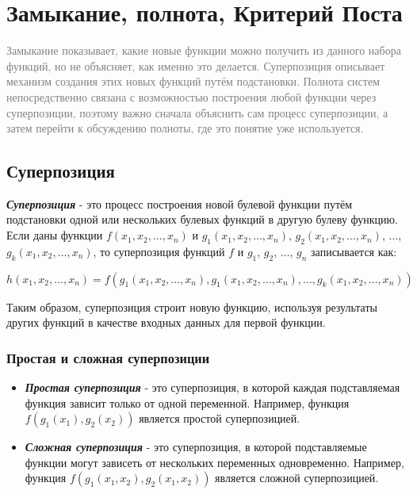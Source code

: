 \documentclass[12pt,letterpaper]{article}
\begin{document}
\section{Замыкание, полнота, Критерий Поста}

\textcolor{gray}{Замыкание показывает, какие новые функции можно получить из данного набора функций, но не объясняет, как именно это делается. Суперпозиция описывает механизм создания этих новых функций путём подстановки. Полнота систем непосредственно связана с возможностью построения любой функции через суперпозиции, поэтому важно сначала объяснить сам процесс суперпозиции, а затем перейти к обсуждению полноты, где это понятие уже используется.}

\subsection{Суперпозиция}

\textbf{\emph{Суперпозиция}} - это процесс построения новой булевой функции путём подстановки одной или нескольких булевых функций в другую булеву функцию. Если даны функции \(f(x_1, x_2, \ldots, x_n)\) и \(g_1(x_1, x_2, \ldots, x_n)\), \(g_2(x_1, x_2, \ldots, x_n)\), \(\ldots\), \(g_k(x_1, x_2, \ldots, x_n)\), то суперпозиция функций \(f\) и \(g_1\), \(g_2\), \(\ldots\), \(g_n\) записывается как:

\[h(x_1, x_2, \ldots, x_n) = f(g_1(x_1, x_2, \ldots, x_n), g_1(x_1, x_2, \ldots, x_n), \ldots, g_k(x_1, x_2, \ldots, x_n))\]

Таким образом, суперпозиция строит новую функцию, используя результаты других функций в качестве входных данных для первой функции.

\subsubsection{Простая и сложная суперпозиции}

\begin{itemize}
  \item \textbf{\emph{Простая суперпозиция}} - это суперпозиция, в которой каждая подставляемая функция зависит только от одной переменной. Например, функция \(f(g_1(x_1), g_2(x_2))\) является простой суперпозицией.
  \item \textbf{\emph{Сложная суперпозиция}} - это суперпозиция, в которой подставляемые функции могут зависеть от нескольких переменных одновременно. Например, функция \(f(g_1(x_1, x_2), g_2(x_1, x_2))\) является сложной суперпозицией. 
\end{itemize}
\end{document}
